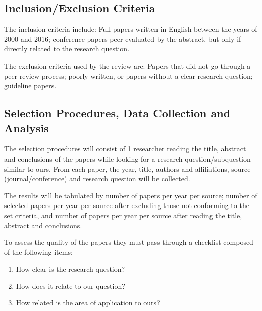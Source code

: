 \documentclass[]{article}
\begin{document}
\subsection{Inclusion/Exclusion Criteria}

The inclusion criteria include: Full papers written in English between the years of 2000 and 2016; conference papers peer evaluated by the abstract, but only if directly related to the research question.

The exclusion criteria used by the review are: Papers that did not go through a peer review process; poorly written, or papers without a clear research question; guideline papers.

\subsection{Selection Procedures, Data Collection and Analysis}

The selection procedures will consist of 1 researcher reading the title, abstract and conclusions of the papers while looking for a research question/subquestion similar to ours.
From each paper, the year, title, authors and affiliations, source (journal/conference) and research question will be collected.

The results will be tabulated by number of papers per year per source; number of selected papers per year per source after excluding those not conforming to the set criteria, and number of papers per year per source after reading the title, abstract and conclusions.

To assess the quality of the papers they must pass through a checklist composed of the following items:

\begin{enumerate}
\item How clear is the research question?
\item How does it relate to our question?
\item How related is the area of application to ours?
\end{enumerate}
\end{document}

